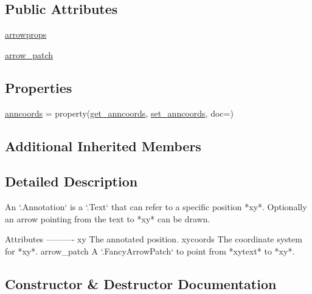\subsection*{Public Attributes}
\begin{DoxyCompactItemize}
\item 
\hyperlink{classmatplotlib_1_1text_1_1Annotation_a4f0a93979003c07b7749599b60099f34}{arrowprops}
\item 
\hyperlink{classmatplotlib_1_1text_1_1Annotation_a9805c725c9a148b0858499e83209da49}{arrow\+\_\+patch}
\end{DoxyCompactItemize}
\subsection*{Properties}
\begin{DoxyCompactItemize}
\item 
\hyperlink{classmatplotlib_1_1text_1_1Annotation_a43ac903014a0b61e82f60e4a3c78b48e}{anncoords} = property(\hyperlink{classmatplotlib_1_1text_1_1Annotation_a3085c0367a0399d0295b5b30bd4323b8}{get\+\_\+anncoords}, \hyperlink{classmatplotlib_1_1text_1_1Annotation_a67a447f47cb92d617950725500222248}{set\+\_\+anncoords}, doc=)
\end{DoxyCompactItemize}
\subsection*{Additional Inherited Members}


\subsection{Detailed Description}
\begin{DoxyVerb}An `.Annotation` is a `.Text` that can refer to a specific position *xy*.
Optionally an arrow pointing from the text to *xy* can be drawn.

Attributes
----------
xy
    The annotated position.
xycoords
    The coordinate system for *xy*.
arrow_patch
    A `.FancyArrowPatch` to point from *xytext* to *xy*.
\end{DoxyVerb}
 

\subsection{Constructor \& Destructor Documentation}
\mbox{\label{classmatplotlib_1_1text_1_1Annotation_a78afac5445d3527cc24b1a986bc9125e}} 
